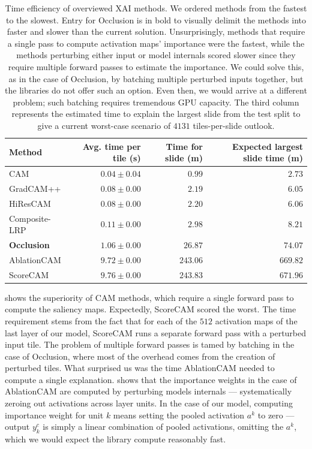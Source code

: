\begin{table}
\centering
{}
\begin{tabular}{@{} l r r r @{}}\toprule
Method & Avg. time per tile (s) & Time for slide (m) & Expected largest slide time (m) \\ 
\midrule
CAM           & $0.04 \pm 0.04$ & $0.99$    & $2.73$ \\
GradCAM++     & $0.08 \pm 0.00$ & $2.19$   & $6.05$ \\
HiResCAM      & $0.08 \pm 0.00$ & $2.20$   & $6.06$ \\
Composite-LRP & $0.11 \pm 0.00$ & $2.98$  & $8.21$ \\
\textbf{Occlusion}     & $1.06 \pm 0.00$ & $26.87$  & $74.07$ \\
AblationCAM   & $9.72 \pm 0.00$ & $243.06$ & $669.82$ \\
ScoreCAM      & $9.76 \pm 0.00$ & $243.83$ & $671.96$ \\
\bottomrule
\end{tabular}
\caption{
Time efficiency of overviewed XAI methods.
We ordered methods from the fastest to the slowest.
Entry for Occlusion is in bold to visually delimit the methods into faster and slower than the current solution.
Unsurprisingly, methods that require a single pass to compute activation maps' importance were the fastest, while the methods perturbing either input or model internals scored slower since they require multiple forward passes to estimate the importance.
We could solve this, as in the case of Occlusion, by batching multiple perturbed inputs together, but the libraries do not offer such an option.
Even then, we would arrive at a different problem; such batching requires tremendous GPU capacity.
The third column represents the estimated time to explain the largest slide from the test split to give a current worst-case scenario of $4131$ tiles-per-slide outlook.
}
\label{tab:comp-time}
\end{table}

 shows the superiority of CAM methods, which require a single forward pass to compute the saliency maps.
Expectedly, ScoreCAM scored the worst.
The time requirement stems from the fact that for each of the $512$ activation maps of the last layer of our model, ScoreCAM runs a separate forward pass with a perturbed input tile.
The problem of multiple forward passes is tamed by batching in the case of Occlusion, where most of the overhead comes from the creation of perturbed tiles.
What surprised us was the time AblationCAM needed to compute a single explanation.
 shows that the importance weights in the case of AblationCAM are computed by perturbing models internals --- systematically zeroing out activations across layer units.
In the case of our model, computing importance weight for unit $k$ means setting the pooled activation $a^k$ to zero --- output $y^c_k$ is simply a linear combination of pooled activations, omitting the $a^k$, which we would expect the library compute reasonably fast.

